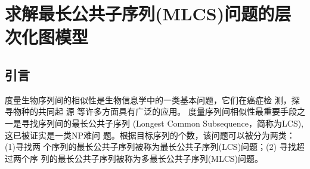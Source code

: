 




\chapter{求解最长公共子序列(MLCS)问题的层次化图模型}

\section{引言}
\label{sec:introduction}

度量生物序列间的相似性是生物信息学中的一类基本问题，它们在癌症检
测\cite{Aravanis2017,Chattopadhyay2016,Munday2017}，探寻物种的共同起
源 \cite{Zvelebil2007,Perry2015,Donnell2015} 等许多方面具有广泛的应用。
度量序列间相似性最重要手段之一是寻找序列间的最长公共子序列 (Longest
Common Subsequence，简称为LCS), 这已被证实是一类NP难问
题\cite{Maier1978}。根据目标序列的个数，该问题可以被分为两类：(1)寻找两
个序列的最长公共子序列被称为最长公共子序列(LCS)问题；(2) 寻找超过两个序
列的最长公共子序列被称为多最长公共子序列(MLCS)问题。

